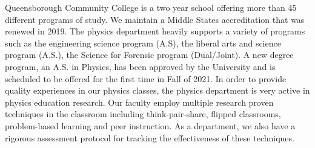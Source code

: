 \documentclass[12pt]{article}
\begin{document}

Queensborough Community College is a two year school offering more than 45 different programs of study.  We maintain a Middle States accreditation that was renewed in 2019.  The physics department heavily supports a variety of programs such as the engineering science program (A.S), the liberal arts and science program (A.S.), the Science for Forensic program (Dual/Joint).  A new degree program, an A.S. in Physics, has been approved by the University and is scheduled to be offered for the first time in Fall of 2021.  In order to provide quality experiences in our physics classes, the physics department is very active in physics education research.  Our faculty employ multiple research proven techniques in the classroom including think-pair-share, flipped classrooms, problem-based learning and peer instruction. As a department, we also have a rigorous assessment protocol for tracking the effectiveness of these techniques.
\vspace{-5mm}
\end{document}
